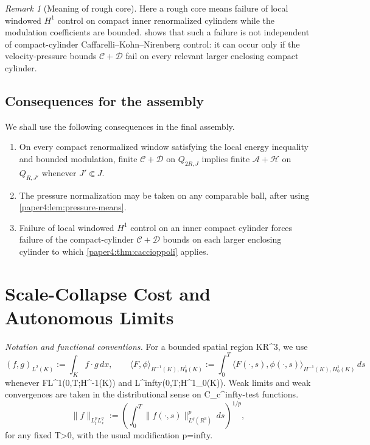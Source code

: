 \documentclass[11pt]{amsart}
\def\({}%
\def\){}%
\def\mathbb#1{#1}%
\def\infty{infty}%
\theoremstyle{plain}
\theoremstyle{definition}
\theoremstyle{remark}
\newtheorem{remark}[remark]{Remark}
\begin{document}
\begin{remark}[Meaning of rough core]
Here a rough core means failure of local windowed $H^1$
control on compact inner renormalized cylinders while the modulation
coefficients are bounded.  shows that such a failure is
not independent of compact-cylinder Caffarelli--Kohn--Nirenberg control: it can
occur only if the velocity-pressure bounds $\mathcal C+\mathcal D$ fail on
every relevant larger enclosing compact cylinder.
\end{remark}

\subsection{Consequences for the assembly}

We shall use the following consequences in the final assembly.
\begin{enumerate}[label=\textup{(\arabic*)}]
\item On every compact renormalized window satisfying the local energy
inequality and bounded modulation, finite $\mathcal C+\mathcal D$ on
$Q_{2R,J}$ implies finite $\mathcal A+\mathcal H$ on $Q_{R,J'}$ whenever
$J'\Subset J$.
\item The pressure normalization may be taken on any comparable ball, after
using \cref{paper4:lem:pressure-means}.
\item Failure of local windowed $H^1$ control on an inner compact cylinder
forces failure of the compact-cylinder $\mathcal C+\mathcal D$ bounds on each
larger enclosing cylinder to which \cref{paper4:thm:caccioppoli} applies.
\end{enumerate}

\clearpage
\section{Scale-Collapse Cost and Autonomous Limits}\label{sec:scale-collapse-cost}
\medskip
\noindent\textit{Notation and functional conventions.}
For a bounded spatial region \(K\subset\mathbb R^3\), we use
\[
  (f,g)_{L^2(K)}:=\int_K f\cdot g\,dx,\qquad
  \langle F,\phi\rangle_{H^{-1}(K),H^1_0(K)}
  :=\int_0^T\langle F(\cdot,s),\phi(\cdot,s)\rangle_{H^{-1}(K),H^1_0(K)}\,ds
\]
whenever \(F\in L^1(0,T;H^{-1}(K))\) and \(\phi\in L^\infty(0,T;H^1_0(K))\). Weak limits and weak convergences are taken in the distributional sense on \(C_c^\infty\)-test functions.
\[
  \|f\|_{L^p_tL^q_x}:=\left(\int_0^T\|f(\cdot,s)\|_{L^q(\mathbb R^3)}^p\,ds\right)^{1/p},
\]
for any fixed \(T>0\), with the usual modification \(p=\infty\).
\end{document}

